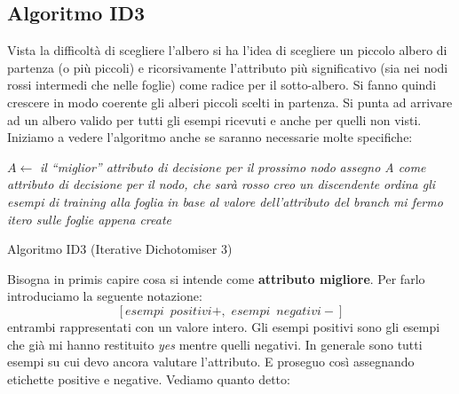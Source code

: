 \documentclass[a4paper,12pt, oneside]{book}
\begin{document}
\subsection{Algoritmo ID3}
Vista la difficoltà di scegliere l'albero si ha l'idea di scegliere un piccolo
albero di partenza (o più piccoli) e ricorsivamente l'attributo più
significativo (sia nei nodi rossi intermedi che nelle foglie) come radice per il
sotto-albero. Si fanno quindi crescere in modo 
coerente gli alberi piccoli scelti in partenza. Si punta ad arrivare ad un
albero valido per tutti gli esempi ricevuti e anche per quelli non visti.\\
Iniziamo a vedere l'algoritmo anche se saranno necessarie molte specifiche:
\begin{algorithm}[H]
  \begin{algorithmic}
    \State $A \gets$ \textit{il ``miglior'' attributo di decisione per il
    prossimo nodo}
    \State \textit{assegno A come attributo di decisione per il nodo, che sarà
    rosso}
    \State \textit{creo un discendente}
    \EndFor
    \State \textit{ordina gli esempi di training alla foglia}
    \State \textit{in base al valore dell'attributo del branch}
    \State \textit{mi fermo}
    \Else
    \State \textit{itero sulle foglie appena create}
    \EndIf
    \EndFunction
  \end{algorithmic}
  \caption{Algoritmo ID3 (Iterative Dichotomiser 3)}
\end{algorithm}
Bisogna in primis capire cosa si intende come \textbf{attributo migliore}. Per
farlo introduciamo la seguente notazione:
\[[esempi\,\,\,positivi+,\,\,esempi\,\,\,negativi-]\]
entrambi rappresentati con un valore intero. Gli esempi positivi sono gli esempi
che già mi hanno restituito \textit{yes} mentre quelli negativi. In generale
sono tutti esempi su cui devo ancora valutare l'attributo. E proseguo così
assegnando etichette positive e negative.
Vediamo quanto detto:

\begin{figure}[H]
  \centering
\end{figure}
\end{document}
